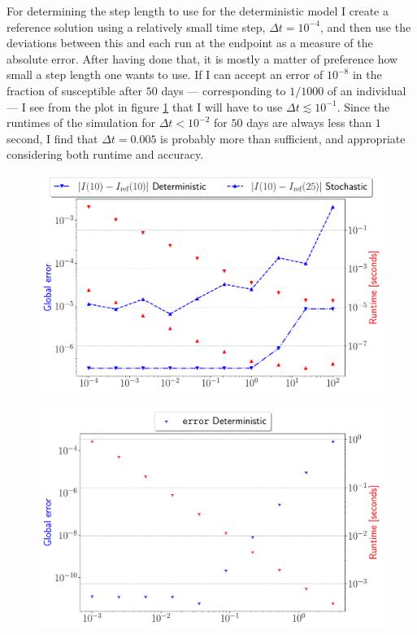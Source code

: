 For determining the step length to use for the deterministic model I create a reference solution using a relatively small time step, $\Delta t = 10^{-4}$, and then use the deviations between this and each run at the endpoint as a measure of the absolute error. After having done that, it is mostly a matter of preference how small a step length one wants to use. If I can accept an error of $10^{-8}$ in the fraction of susceptible after $50$ days --- corresponding to $1/1000$ of an individual --- I see from the plot in figure \ref{fig:timesteps_det} that I will have to use $\Delta t \lesssim 10^{-1}$. Since the runtimes of the simulation for $\Delta t < 10^{-2}$ for $50$ days are always less than $1$ second, I find that $\Delta t = 0.005$ is probably more than sufficient, and appropriate considering both runtime and accuracy.    
\begin{figure}[htb]
\centering
\begin{minipage}[c]{0.49\columnwidth}
	\centering
	\includegraphics[width=\columnwidth]{../fig/timestep.pdf}
	\label{fig:timesteps}
\end{minipage}
\hfill
\begin{minipage}[c]{0.49\columnwidth}
	\centering
	\includegraphics[width=\columnwidth]{../fig/timestep_det.pdf}
	\label{fig:timesteps_det}
\end{minipage}
\end{figure}
